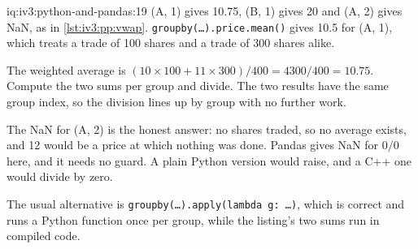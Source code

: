 \begin{solution}{iq:iv3:python-and-pandas:19}
(A, 1) gives 10.75, (B, 1) gives 20 and (A, 2) gives NaN, as in \cref{lst:iv3:pp:vwap}. \texttt{groupby(\dots).price.mean()} gives 10.5 for (A, 1), which treats a trade of 100 shares and a trade of 300 shares alike.
\label{lst:iv3:pp:vwap}

The weighted average is $(10 \times 100 + 11 \times 300) / 400 = 4300 / 400 = 10.75$. Compute the two sums per group and divide. The two results have the same group index, so the division lines up by group with no further work.

The NaN for (A, 2) is the honest answer: no shares traded, so no average exists, and 12 would be a price at which nothing was done. Pandas gives NaN for $0 / 0$ here, and it needs no guard. A plain Python version would raise, and a C++ one would divide by zero.

The usual alternative is \texttt{groupby(\dots).apply(lambda g: \dots)}, which is correct and runs a Python function once per group, while the listing's two sums run in compiled code.

\end{solution}

